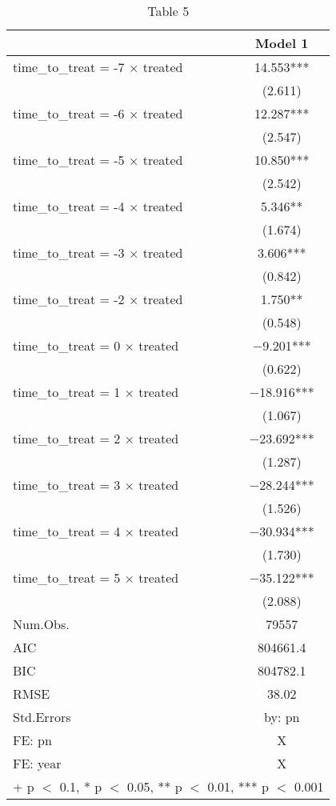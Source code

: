 \begin{table}

\caption{\label{tab:write-results}Table 5}
\centering
\begin{tabular}[t]{lc}
\toprule
  & Model 1\\
\midrule
time\_to\_treat = -7 × treated & \num{14.553}***\\
 & (\num{2.611})\\
time\_to\_treat = -6 × treated & \num{12.287}***\\
 & (\num{2.547})\\
time\_to\_treat = -5 × treated & \num{10.850}***\\
 & (\num{2.542})\\
time\_to\_treat = -4 × treated & \num{5.346}**\\
 & (\num{1.674})\\
time\_to\_treat = -3 × treated & \num{3.606}***\\
 & (\num{0.842})\\
time\_to\_treat = -2 × treated & \num{1.750}**\\
 & (\num{0.548})\\
time\_to\_treat = 0 × treated & \num{-9.201}***\\
 & (\num{0.622})\\
time\_to\_treat = 1 × treated & \num{-18.916}***\\
 & (\num{1.067})\\
time\_to\_treat = 2 × treated & \num{-23.692}***\\
 & (\num{1.287})\\
time\_to\_treat = 3 × treated & \num{-28.244}***\\
 & (\num{1.526})\\
time\_to\_treat = 4 × treated & \num{-30.934}***\\
 & (\num{1.730})\\
time\_to\_treat = 5 × treated & \num{-35.122}***\\
 & (\num{2.088})\\
\midrule
Num.Obs. & \num{79557}\\
AIC & \num{804661.4}\\
BIC & \num{804782.1}\\
RMSE & \num{38.02}\\
Std.Errors & by: pn\\
FE: pn & X\\
FE: year & X\\
\bottomrule
\multicolumn{2}{l}{\rule{0pt}{1em}+ p $<$ 0.1, * p $<$ 0.05, ** p $<$ 0.01, *** p $<$ 0.001}\\
\end{tabular}
\end{table}
